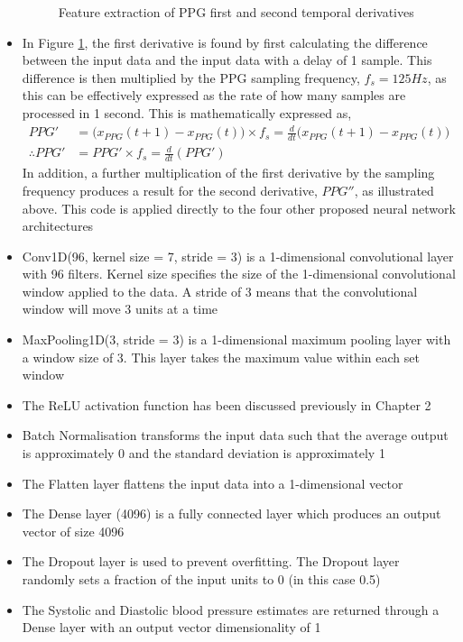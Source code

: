 \begin{itemize}
\begin{figure}[H]
\begin{python}
        \end{python}    
        \caption{Feature extraction of PPG first and second temporal derivatives}
    \label{pythonDeriv} 
\end{figure}
    \item In Figure \ref{pythonDeriv}, the first derivative is found by first calculating the difference between the input data and the input data with a delay of 1 sample. This difference is then multiplied by the PPG sampling frequency, $f_s = 125 Hz$, as this can be effectively expressed as the rate of how many samples are processed in 1 second. This is mathematically expressed as,
    \begin{align}
        PPG' &= \bigg(x_{PPG}(t + 1) - x_{PPG}(t)\bigg) \times f_s = \frac{d}{dt} \bigg(x_{PPG}(t + 1) - x_{PPG}(t)\bigg)\\
        \therefore PPG' &= PPG' \times f_s = \frac{d}{dt} (PPG')
    \end{align}\noindent In addition, a further multiplication of the first derivative by the sampling frequency produces a result for the second derivative, $PPG''$, as illustrated above. This code is applied directly to the four other proposed neural network architectures
    \item Conv1D(96, kernel size = 7, stride = 3) is a 1-dimensional convolutional layer with 96 filters. Kernel size specifies the size of the 1-dimensional convolutional window applied to the data. A stride of 3 means that the convolutional window will move 3 units at a time
    \item MaxPooling1D(3, stride = 3) is a 1-dimensional maximum pooling layer with a window size of 3. This layer takes the maximum value within each set window
    \item The ReLU activation function has been discussed previously in Chapter 2
    \item Batch Normalisation transforms the input data such that the average output is approximately 0 and the standard deviation is approximately 1
    \item The Flatten layer flattens the input data into a 1-dimensional vector
    \item The Dense layer (4096) is a fully connected layer which produces an output vector of size 4096
    \item The Dropout layer is used to prevent overfitting. The Dropout layer randomly sets a fraction of the input units to 0 (in this case 0.5)
    \item The Systolic and Diastolic blood pressure estimates are returned through a Dense layer with an output vector dimensionality of 1
\end{itemize}

